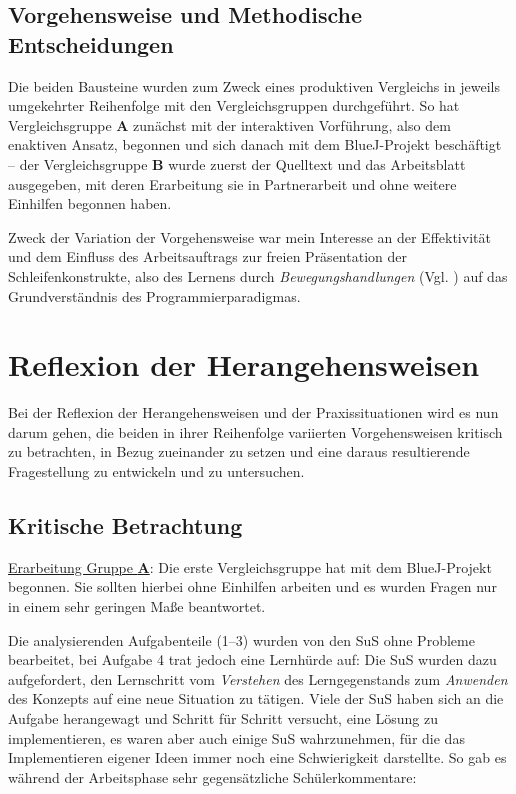 \documentclass[paper=a4, DIV=13, BCOR=12mm, twoside=on, onecolumn=on, open = any, titlepage =on, parskip =half-, headsepline = on, footsepline = on, chapterprefix = on, sectionprefix = on, appendixprefix = off, fontsize = 11pt, numbers = noenddot, abstract = off]{scrreprt}
\begin{document}
\par \singlespacing
 \section{Vorgehensweise und Methodische Entscheidungen}
 \label{sec:vorgehensweisen}
\onehalfspacing

Die beiden Bausteine wurden zum Zweck eines produktiven Vergleichs in jeweils umgekehrter Reihenfolge mit den Vergleichsgruppen durchgeführt. So hat Vergleichsgruppe \textsc{\textbf{A}} zunächst mit der interaktiven Vorführung, also dem enaktiven Ansatz, begonnen und sich danach mit dem BlueJ-Projekt beschäftigt -- der Vergleichsgruppe \textsc{\textbf{B}} wurde zuerst der Quelltext und das Arbeitsblatt ausgegeben, mit deren Erarbeitung sie in Partnerarbeit und ohne weitere Einhilfen begonnen haben. 

Zweck der Variation der Vorgehensweise war mein Interesse an der Effektivität und dem Einfluss des Arbeitsauftrags zur freien Präsentation der Schleifenkonstrukte, also des Lernens durch \emph{Bewegungshandlungen} (Vgl. \cite[S.183f.]{aebli:11}) auf das Grundverständnis des Programmierparadigmas.



\par \singlespacing
\chapter{Reflexion der Herangehensweisen}
\onehalfspacing
 Bei der Reflexion der Herangehensweisen und der Praxissituationen wird es nun darum gehen, die beiden in ihrer Reihenfolge variierten Vorgehensweisen kritisch zu betrachten, in Bezug zueinander zu setzen und eine daraus resultierende Fragestellung zu entwickeln und zu untersuchen.

\par \singlespacing
\section{Kritische Betrachtung}
\onehalfspacing

\underline{Erarbeitung Gruppe \textsc{\textbf{A}}}: Die erste Vergleichsgruppe hat mit dem BlueJ-Projekt begonnen. Sie sollten hierbei ohne Einhilfen arbeiten und es wurden Fragen nur in einem sehr geringen Maße beantwortet. 

Die analysierenden Aufgabenteile (1--3) wurden von den SuS ohne Probleme bearbeitet, bei Aufgabe 4 trat jedoch eine Lernhürde auf: Die SuS wurden dazu aufgefordert, den Lernschritt vom \emph{Verstehen} des Lerngegenstands zum \emph{Anwenden} des Konzepts auf eine neue Situation zu tätigen. Viele der SuS haben sich an die Aufgabe herangewagt und Schritt für Schritt versucht, eine Lösung zu implementieren, es waren aber auch einige SuS wahrzunehmen, für die das Implementieren eigener Ideen immer noch eine Schwierigkeit darstellte. So gab es während der Arbeitsphase sehr gegensätzliche Schülerkommentare:
\end{document}
